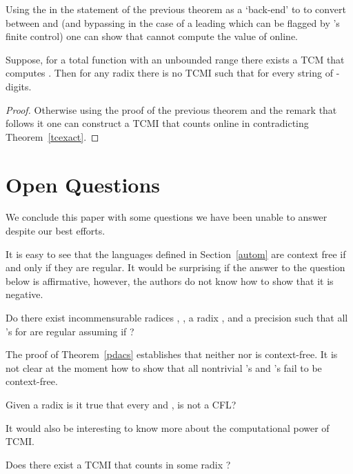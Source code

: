 \documentclass[12pt]{article}
\begin{document}
Using the  in the statement of the previous theorem as a
`back-end' to  to convert between  and  (and bypassing
 in the case of a leading  which can be flagged by 's
finite control) one can show that  cannot compute the value of
 online.

\begin{theorem}\label{tcmio}
Suppose, for a total function  with an unbounded range there exists a
TCM  that computes . Then for any radix  there is no TCMI  such that
 for every string of
-digits.
\end{theorem}
\begin{proof}
Otherwise using the proof of the previous theorem and the remark that
follows it one can construct a TCMI that counts online in 
contradicting Theorem~\ref{tcexact}.
\end{proof}

\section{Open Questions}

We conclude this paper with some questions we have been unable to
answer despite our best efforts.

It is easy to see that the languages  defined in
Section~\ref{autom} are context free if and only if they are
regular. It would be surprising if the answer to the question below is
affirmative, however, the authors do not know how to show that it is negative.

\begin{question}
Do there exist incommensurable radices , , a radix , and a precision  
such that all 's for  are regular assuming  if ?
\end{question}

The proof of Theorem~\ref{pdacs} establishes that neither  nor 
is context-free. It is not clear at the moment how to show that all
nontrivial 's and 's fail to be context-free.
\begin{question}
Given a radix  is it true that every  and ,
 is not a CFL?
\end{question}

It would also be interesting to know more about the computational
power of TCMI.

\begin{question}
Does there exist a TCMI that counts in some radix ?
\end{question}
{}

\end{document}

